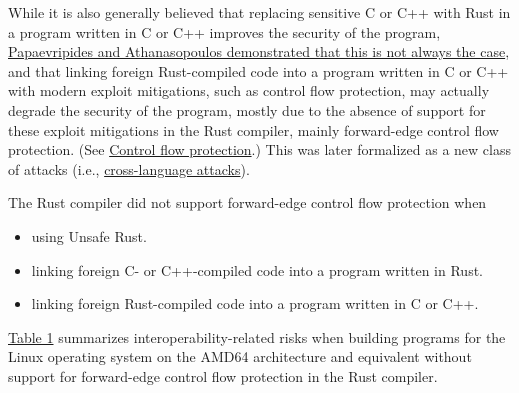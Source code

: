 \documentclass{article}
\begin{document}
While it is also generally believed that replacing sensitive C or C++ with Rust in a program written in C or C++ improves the security of the program, \href{https://dl.acm.org/doi/pdf/10.1145/3418898}{Papaevripides and Athanasopoulos demonstrated that this is not always the case}, and that linking foreign Rust-compiled code into a program written in C or C++ with modern exploit mitigations, such as control flow protection, may actually degrade the security of the program, mostly due to the absence of support for these exploit mitigations in the Rust compiler, mainly forward-edge control flow protection. (See \hyperref[control-flow-protection]{Control flow protection}.) This was later formalized as a new class of attacks (i.e., \href{https://www.ndss-symposium.org/wp-content/uploads/2022-78-paper.pdf}{cross-language attacks}).

The Rust compiler did not support forward-edge control flow protection when

\begin{itemize}
\item using Unsafe Rust.
\item linking foreign C- or C++-compiled code into a program written in Rust.
\item linking foreign Rust-compiled code into a program written in C or C++.
\end{itemize}

\hyperref[table1]{Table 1} summarizes interoperability-related risks when building programs for the Linux operating system on the AMD64 architecture and equivalent without support for forward-edge control flow protection in the Rust compiler.
\end{document}
